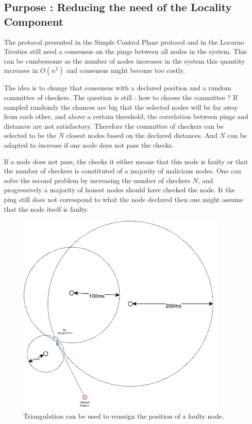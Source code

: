 \documentclass[a4paper,11pt,oneside]{report}
\begin{document}
\subsection{Purpose : Reducing the need of the Locality Component}
The protocol presented in the Simple Control Plane protocol and in the Locarno
Treaties still need a consensus on the pings between all nodes in the system.
This can be cumbersome as the number of nodes increases in the system this
quantity increases in $O(n^2)$ and consensus might become too costly. 

The idea is to change that consensus with a declared position and a random
committee of checkers. The question is still : how to choose the committee ? If
sampled randomly the chances are big that the selected nodes will be far away
from each other, and above a certain threshold, the correlation between pings
and distances are not satisfactory. Therefore the committee of checkers can be
selected to be the $N$ closest nodes based on the declared distances. And $N$
can be adapted to increase if one node does not pass the checks. 

If a node does not pass, the checks it either means that this node is faulty or
that the number of checkers is constituted of a majority of malicious nodes.
One can solve the second problem by increasing the number of checkers $N$, and
progressively a majority of honest nodes should have checked the node. It the
ping still does not correspond to what the node declared then one might assume
that the node itself is faulty. 

\begin{figure}[!h] 
\centering
\includegraphics[width=300pt]{figures/triangulation_strategy}
\caption{Triangulation can be used to reassign the position of a faulty node.  }
\label{fig:triangulation_strategy}
\end{figure}
\end{document}
